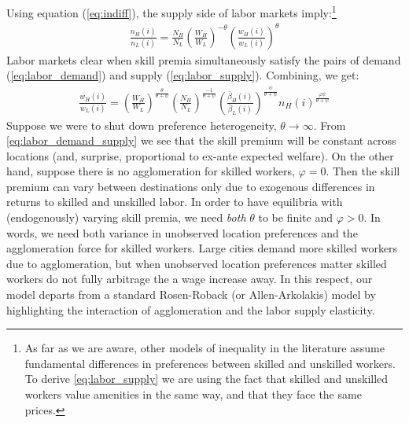 \documentclass[12 pt]{article}
\begin{document}
Using equation (\ref{eq:indiff}), the supply side of labor markets imply:\footnote{As far as we are aware, other models of inequality in the literature assume fundamental differences in preferences between skilled and unskilled workers.  To derive \eqref{eq:labor_supply} we are using the fact that skilled and unskilled workers value amenities in the same way, and that they face the same prices.}
\begin{eqnarray}\label{eq:labor_supply}
    \frac{n_H(i)}{n_L(i)} = \frac{N_H}{N_L} \left(\frac{W_H}{W_L} \right)^{-\theta}
    \left( \frac{w_H(i)}{w_L(i)}\right)^{\theta}
\end{eqnarray}
Labor markets clear when skill premia simultaneously satisfy the pairs of demand (\ref{eq:labor_demand}) and supply (\ref{eq:labor_supply}).  Combining, we get:
\begin{eqnarray}\label{eq:labor_demand_supply}
    \frac{w_H(i)}{w_L(i)} = \left(\frac{W_H}{W_L}\right)^{\frac{\theta}{\theta + \psi}}\left(\frac{N_H}{N_L}\right)^{\frac{-1}{\theta + \psi}} \left(\frac{\bar{\beta}_H(i)}{\bar{\beta}_L(i)}\right)^{\frac{\psi}{\theta + \psi}} n_H(i)^{\frac{\varphi \psi}{\theta + \psi}}
\end{eqnarray}
Suppose we were to shut down preference heterogeneity, $\theta \rightarrow \infty$.  From \eqref{eq:labor_demand_supply} we see that the skill premium will be constant across locations (and, surprise, proportional to ex-ante expected welfare).  On the other hand, suppose there is no agglomeration for skilled workers, $\varphi = 0$.  Then the skill premium can vary between destinations only due to exogenous differences in returns to skilled and unskilled labor.  In order to have equilibria with (endogenously) varying skill premia, we need \emph{both} $\theta$ to be finite and $\varphi >0$. In words, we need both variance in unobserved location preferences and the agglomeration force for skilled workers.  Large cities demand more skilled workers due to agglomeration, but when unobserved location preferences matter skilled workers do not fully arbitrage the a wage increase away. In this respect, our model departs from a standard Rosen-Roback (or Allen-Arkolakis) model by highlighting the interaction of agglomeration and the labor supply elasticity. 
\end{document}
